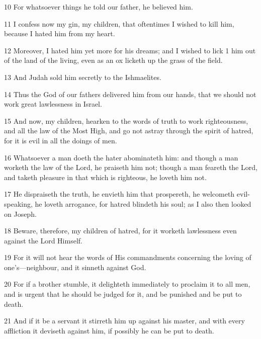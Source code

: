 \par 10 For whatsoever things he told our father, he believed him.

\par 11 I confess now my gin, my children, that oftentimes I wished to kill him, because I hated him from my heart.

\par 12 Moreover, I hated him yet more for his dreams; and I wished to lick 1 him out of the land of the living, even as an ox licketh up the grass of the field.

\par 13 And Judah sold him secretly to the Ishmaelites.

\par 14 Thus the God of our fathers delivered him from our hands, that we should not work great lawlessness in Israel.

\par 15 And now, my children, hearken to the words of truth to work righteousness, and all the law of the Most High, and go not astray through the spirit of hatred, for it is evil in all the doings of men.

\par 16 Whatsoever a man doeth the hater abominateth him: and though a man worketh the law of the Lord, he praiseth him not; though a man feareth the Lord, and taketh pleasure in that which is righteous, he loveth him not.

\par 17 He dispraiseth the truth, he envieth him that prospereth, he welcometh evil-speaking, he loveth arrogance, for hatred blindeth his soul; as I also then looked on Joseph.

\par 18 Beware, therefore, my children of hatred, for it worketh lawlessness even against the Lord Himself.

\par 19 For it will not hear the words of His commandments concerning the loving of one's—neighbour, and it sinneth against God.

\par 20 For if a brother stumble, it delighteth immediately to proclaim it to all men, and is urgent that he should be judged for it, and be punished and be put to death.

\par 21 And if it be a servant it stirreth him up against his master, and with every affliction it deviseth against him, if possibly he can be put to death.

